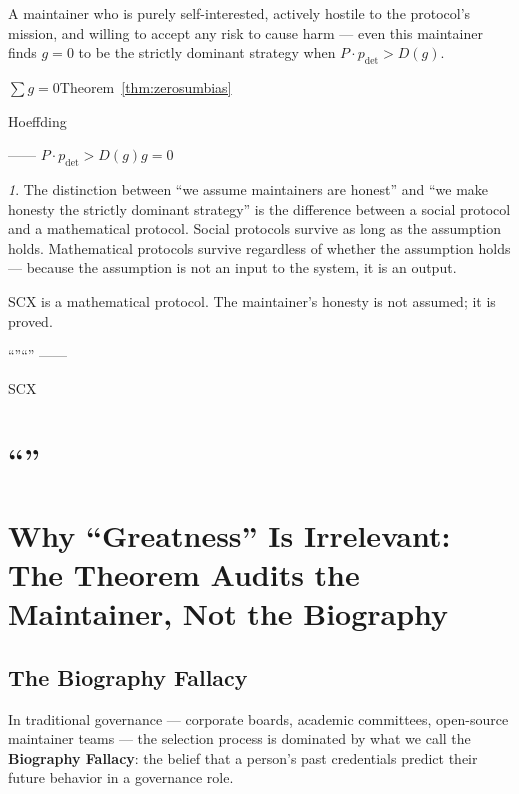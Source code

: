 \documentclass[12pt,a4paper]{article}
\theoremstyle{remark}
\newtheorem{govnote}{}[section]
\newenvironment{govbox}{%
  \begin{center}
  \color{blue}
  \begin{minipage}{0.92\textwidth}
  \begin{govnote}
}{%
  \end{govnote}
  \end{minipage}
  \end{center}
}
\begin{document}
A maintainer who is purely self-interested, actively hostile to the protocol's
mission, and willing to accept any risk to cause harm — even this maintainer
finds $g = 0$ to be the strictly dominant strategy when $P \cdot p_{\text{det}} > D(g)$.

\noindent\textbf{}
$\sum g = 0$Theorem~\ref{thm:zerosumbias}

Hoeffding

——
$P \cdot p_{\text{det}} > D(g)$$g = 0$

\begin{govbox}
The distinction between ``we assume maintainers are honest'' and ``we make
honesty the strictly dominant strategy'' is the difference between a social
protocol and a mathematical protocol. Social protocols survive as long as the
assumption holds. Mathematical protocols survive regardless of whether the
assumption holds — because the assumption is not an input to the system, it is
an output.

SCX is a mathematical protocol. The maintainer's honesty is not assumed; it is
proved.

\begin{center}
\small\textbf{}
“”“”
——


SCX
\end{center}
\end{govbox}

\newpage

\section{“”}
\section{Why ``Greatness'' Is Irrelevant: The Theorem Audits the Maintainer, Not the Biography}

\subsection{The Biography Fallacy}

In traditional governance — corporate boards, academic committees, open-source
maintainer teams — the selection process is dominated by what we call the
\textbf{Biography Fallacy}: the belief that a person's past credentials predict
their future behavior in a governance role.
\end{document}
